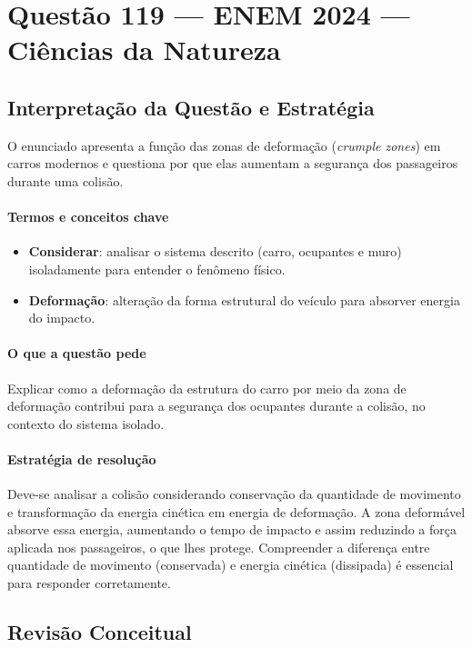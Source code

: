 \documentclass{article}
\begin{document}
\section*{Questão 119 --- ENEM 2024 --- Ciências da Natureza}

\subsection*{Interpretação da Questão e Estratégia}

O enunciado apresenta a função das zonas de deformação (\emph{crumple zones}) em carros modernos e questiona por que elas aumentam a segurança dos passageiros durante uma colisão.

\paragraph{Termos e conceitos chave}
\begin{itemize}
  \item \textbf{Considerar}: analisar o sistema descrito (carro, ocupantes e muro) isoladamente para entender o fenômeno físico.
  \item \textbf{Deformação}: alteração da forma estrutural do veículo para absorver energia do impacto.
\end{itemize}

\paragraph{O que a questão pede}
Explicar como a deformação da estrutura do carro por meio da zona de deformação contribui para a segurança dos ocupantes durante a colisão, no contexto do sistema isolado.

\paragraph{Estratégia de resolução}
Deve-se analisar a colisão considerando conservação da quantidade de movimento e transformação da energia cinética em energia de deformação. A zona deformável absorve essa energia, aumentando o tempo de impacto e assim reduzindo a força aplicada nos passageiros, o que lhes protege. Compreender a diferença entre quantidade de movimento (conservada) e energia cinética (dissipada) é essencial para responder corretamente.

\bigskip

\subsection*{Revisão Conceitual}
\end{document}
